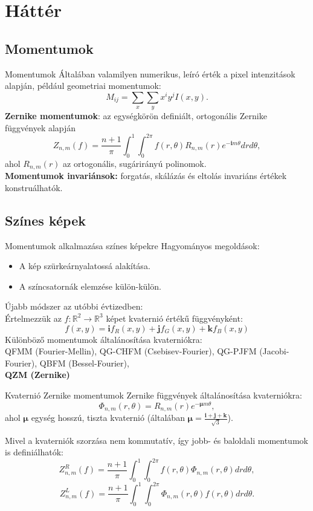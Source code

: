 \documentclass{beamer}
\newcommand{\R}{\mathbb{R}}
\newcommand{\qi}{\textbf{i}}
\newcommand{\qj}{\textbf{j}}
\newcommand{\qk}{\textbf{k}}
\newcommand{\qmu}{\boldsymbol{\mu}}
\def\R{{\mathbb R}}
\begin{document}
\section{Háttér}
\subsection{Momentumok}
\begin{frame}{Momentumok}
Általában valamilyen numerikus, leíró érték a pixel intenzitások alapján, 
például geometriai momentumok: $$M_{ij} = \sum_x\sum_y x^i y^j I(x,y).$$
\textbf{Zernike momentumok}: az egységkörön definiált, ortogonális Zernike függvények alapján
$$Z_{n,m}(f) = \frac{n+1}{\pi}\int_0^1\int_0^{2\pi}f(r,\theta)R_{n,m}(r)e^{-\qi m\theta} dr d\theta,$$ ahol $R_{n,m}(r)$ az ortogonális, sugárirányú polinomok.\\

\textbf{Momentumok invariánsok:} forgatás, skálázás és eltolás invariáns értékek konstruálhatók.
\end{frame}

\subsection{Színes képek}
\begin{frame}{Momentumok alkalmazása színes képekre}
Hagyományos megoldások:
\begin{itemize}
    \item A kép szürkeárnyalatossá alakítása.
    \item A színcsatornák elemzése külön-külön.
\end{itemize}
Újabb módszer az utóbbi évtizedben:\\
Értelmezzük az $f : \R^2 \rightarrow \R^3$ képet kvaternió értékű függvényként:
$$f(x,y) = \qi f_R(x,y) + \qj f_G(x,y) + \qk f_B(x,y)$$
Különböző momentumok általánosítása kvaterniókra:\\
QFMM (Fourier-Mellin), QG-CHFM (Csebisev-Fourier), QG-PJFM (Jacobi-Fourier), QBFM (Bessel-Fourier), \\
\textbf{QZM (Zernike)}
\end{frame}

\begin{frame}{Kvaternió Zernike momentumok}
\vskip 3mm
Zernike függvények általánosítása kvaterniókra: $$\Phi_{n,m}(r,\theta) = R_{n,m}(r)e^{-\qmu m \theta},$$ ahol $\qmu$ egység hosszú, tiszta kvaternió (általában $\qmu = \frac{\qi + \qj + \qk}{\sqrt{3}}$).

Mivel a kvaterniók szorzása nem kommutatív, így jobb- és baloldali momentumok is definiálhatók:
$$Z^R_{n,m}(f) = \frac{n+1}{\pi}\int_0^1\int_0^{2\pi}f(r,\theta)\Phi_{n,m}(r,\theta) dr d\theta,$$
$$Z^L_{n,m}(f) = \frac{n+1}{\pi}\int_0^1\int_0^{2\pi}\Phi_{n,m}(r,\theta)f(r,\theta) dr d\theta.$$

\end{frame}
\end{document}
